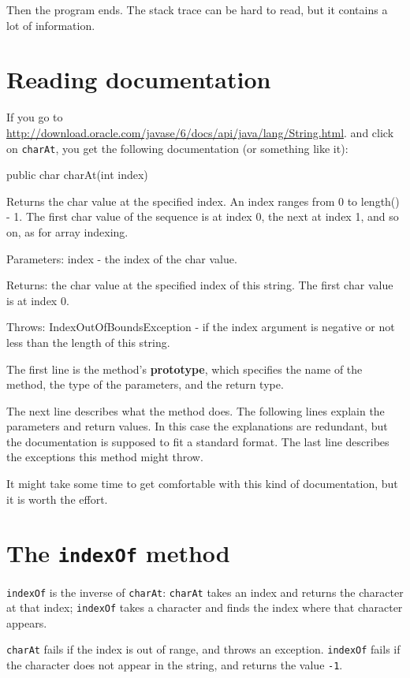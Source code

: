 \documentclass[12pt]{book}
\theoremstyle{exercise}
\begin{document}
Then the program ends.
The stack trace can be hard to read, but it contains a lot of information.


\section{Reading documentation}
\label{documentation}

If you go to
\url{http://download.oracle.com/javase/6/docs/api/java/lang/String.html}.
and click on {\tt charAt}, you get the following documentation
(or something like it):

\begin{verbatimtab}
public char charAt(int index)

Returns the char value at the specified index. An index ranges
from 0 to length() - 1. The first char value of the sequence is
at index 0, the next at index 1, and so on, as for array indexing.

Parameters: index - the index of the char value.

Returns: the char value at the specified index of this string.
  The first char value is at index 0.

Throws: IndexOutOfBoundsException - if the index argument is
  negative or not less than the length of this string.
\end{verbatimtab}

The first line is the method's {\bf prototype}, which specifies the
name of the method, the type of the parameters, and the return type.

The next line describes what the method does.  The following
lines explain the parameters and return values.  In this case
the explanations are redundant, but the documentation is
supposed to fit a standard format.  The last line describes
the exceptions this method might throw.

It might take some time to get
comfortable with this kind of documentation, but it is worth the effort.


\section{The {\tt indexOf} method}

{\tt indexOf} is the inverse of {\tt charAt}:
{\tt charAt} takes an index and returns the character at that
index;  {\tt indexOf} takes a character and finds the index
where that character appears.

{\tt charAt} fails if the index is out of range, and throws an
exception.  {\tt indexOf} fails if the character does not appear in
the string, and returns the value {\tt -1}.
\end{document}
